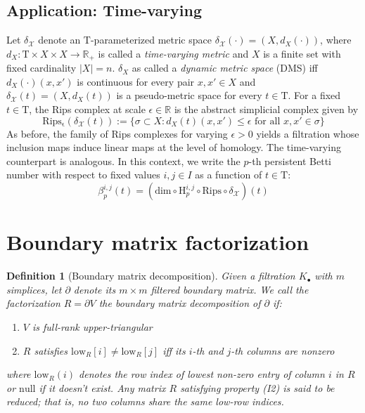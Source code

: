 \documentclass[10pt]{article}
\newcommand{\+}{%
	\raisebox{0.18ex}{\scaleobj{0.55}{+}}
}
\newtheorem{definition}{Definition}
\begin{document}


\subsection{Application: Time-varying }
Let $\delta_\mathcal{X}$ denote an $\mathrm{T}$-parameterized metric space $\delta_\mathcal{X}(\cdot) = ( X, d_X(\cdot) )$, where $d_X: \mathrm{T} \times X \times X \to \mathbb{R}_+$ is called a \emph{time-varying metric}  and $X$ is a finite set with fixed cardinality $\lvert X \rvert = n$. $\delta_X$ as called a \emph{dynamic metric space} (DMS) iff $d_X(\cdot)(x, x')$ is continuous for every pair $x, x' \in X$ and $\delta_\mathcal{X}(t) = (X, d_X(t))$ is a pseudo-metric space for every $t \in \mathrm{T}$. 
For a fixed $t \in \mathrm{T}$, the Rips complex at scale $\epsilon \in \mathbb{R}$ is the abstract simplicial complex given by 
\begin{equation}
	\mathrm{Rips_{\epsilon}}(\delta_\mathcal{X}(t)) := \{ \sigma \subset X : d_X(t)(x, x') \leq \epsilon \text{ for all } x, x' \in \sigma \}
\end{equation}
\noindent As before, the family of Rips complexes for varying $\epsilon > 0$ yields a filtration whose inclusion maps induce linear maps at the level of homology. The time-varying counterpart is analogous.  
In this context, we write the $p$-th persistent Betti number with respect to fixed values $i,j \in I$ as a function of $t \in \mathrm{T}$: 
\begin{equation}
\beta_{p}^{i,j}(t) = \left(\mathrm{dim} \circ \mathrm{H}_p^{i,j} \circ \mathrm{Rips} \circ \delta_\mathcal{X} \right)(t)
\end{equation}





\appendix

\section{Boundary matrix factorization}
\begin{definition}[Boundary matrix decomposition]
Given a filtration $K_\bullet$ with $m$ simplices, let $\partial$ denote its $m \times m$ filtered boundary matrix. We call the factorization $R = \partial V$ the \emph{boundary matrix decomposition} of $\partial$ if:
 \begin{enumerate}[labelsep=3pt, topsep=3pt, itemsep=-0.10ex,parsep=1.2ex]
 	\item[I1.] $V$ is full-rank upper-triangular
 	\item[I2.] $R$ satisfies $\mathrm{low}_R[i] \neq \mathrm{low}_R[j]$ iff its $i$-th and $j$-th columns are nonzero
 	\end{enumerate} 
 	where $\mathrm{low}_R(i)$ denotes the row index of lowest non-zero entry of column $i$ in $R$ or $\mathrm{null}$ if it doesn't exist. Any matrix $R$ satisfying property (I2) is said to be  \emph{reduced}; that is, no two columns share the same low-row indices.
\end{definition}
\end{document}

